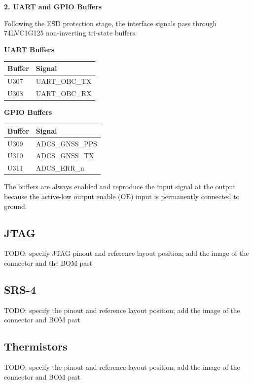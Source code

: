 \documentclass[10pt]{../datasheet}
\begin{document}
\textbf{2. UART and GPIO Buffers}

Following the ESD protection stage, the interface signals pass through 74LVC1G125 non-inverting tri-state buffers.

\textbf{UART Buffers}

\begin{center}
\begin{tabular}{l l}
\hline
\textbf{Buffer} & \textbf{Signal} \\
\hline
U307 & UART\_OBC\_TX \\
U308 & UART\_OBC\_RX \\
\hline
\end{tabular}
\end{center}

\textbf{GPIO Buffers}

\begin{center}
\begin{tabular}{l l}
\hline
\textbf{Buffer} & \textbf{Signal} \\
\hline
U309 & ADCS\_GNSS\_PPS \\
U310 & ADCS\_GNSS\_TX \\
U311 & ADCS\_ERR\_n \\
\hline
\end{tabular}
\end{center}

The buffers are always enabled and reproduce the input signal at the output because the active-low output enable ($\overline{\mathrm{OE}}$) input is permanently connected to ground.

\subsection{JTAG}

TODO: specify JTAG pinout and reference layout position; add the image of the
connector and the BOM part

\subsection{SRS-4}

TODO: specify the pinout and reference layout position; add the image of the
connector and BOM part

\subsection{Thermistors}

TODO: specify the pinout and reference layout position; add the image of the
connector and BOM part
\end{document}

